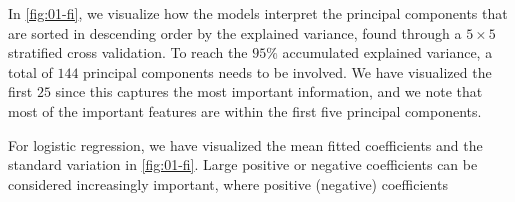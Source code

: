 

In \autoref{fig:01-fi}, we visualize how the models interpret the principal components that are sorted in descending order by the explained variance, found through a $5\times 5$ stratified cross validation. To reach the $95\%$ accumulated explained variance, a total of $144$ principal components needs to be involved. We have visualized the first $25$ since this captures the most important information, and we note that most of the important features are within the first five principal components.

For logistic regression, we have visualized the mean fitted coefficients and the standard variation in \autoref{fig:01-fi}. Large positive or negative coefficients can be considered increasingly important, where positive (negative) coefficients

